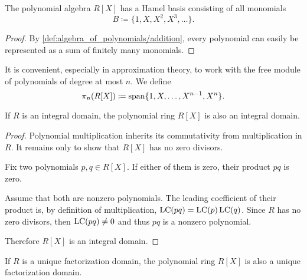 \begin{proposition}\label{thm:polynomial_algebra_basis}
  The polynomial algebra \( R[X] \) has a Hamel basis consisting of all monomials
  \begin{equation*}
    B \coloneqq \{ 1, X, X^2, X^3, \ldots \}.
  \end{equation*}
\end{proposition}
\begin{proof}
  By \cref{def:algebra_of_polynomials/addition}, every polynomial can easily be represented as a sum of finitely many monomials.
\end{proof}

\begin{definition}\label{def:polynomial_free_module}
  It is convenient, especially in approximation theory, to work with the free module of polynomials of degree at most \( n \). We define
  \begin{equation*}
    \pi_n(R[X]) \coloneqq \operatorname{span} \{ 1, X, \ldots, X^{n-1}, X^n \}.
  \end{equation*}
\end{definition}

\begin{proposition}\label{thm:polynomials_over_integral_domain_are_integral_domain}
  If \( R \) is an integral domain, the polynomial ring \( R[X] \) is also an integral domain.
\end{proposition}
\begin{proof}
  Polynomial multiplication inherits its commutativity from multiplication in \( R \). It remains only to show that \( R[X] \) has no zero divisors.

  Fix two polynomials \( p, q \in R[X] \). If either of them is zero, their product \( pq \) is zero.

  Assume that both are nonzero polynomials. The leading coefficient of their product is, by definition of multiplication, \( \operatorname{LC}(pq) = \operatorname{LC}(p) \operatorname{LC}(q) \). Since \( R \) has no zero divisors, then \( \operatorname{LC}(pq) \neq 0 \) and thus \( pq \) is a nonzero polynomial.

  Therefore \( R[X] \) is an integral domain.
\end{proof}

\begin{proposition}\label{thm:polynomials_over_unique_factorization_domain_are_unique_factorization_domain}
  If \( R \) is a unique factorization domain, the polynomial ring \( R[X] \) is also a unique factorization domain.
\end{proposition}

